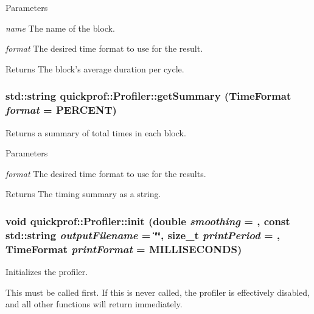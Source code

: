 \begin{DoxyParams}{Parameters}
\item[{\em name}]The name of the block. \item[{\em format}]The desired time format to use for the result. \end{DoxyParams}
\begin{DoxyReturn}{Returns}
The block's average duration per cycle. 
\end{DoxyReturn}
\hypertarget{classquickprof_1_1_profiler_aa05f7c66bdaa565267235dc76671bf1e}{
\subsubsection[{getSummary}]{\setlength{\rightskip}{0pt plus 5cm}std::string quickprof::Profiler::getSummary ({\bf TimeFormat} {\em format} = {\ttfamily PERCENT})}}
\label{classquickprof_1_1_profiler_aa05f7c66bdaa565267235dc76671bf1e}
Returns a summary of total times in each block.


\begin{DoxyParams}{Parameters}
\item[{\em format}]The desired time format to use for the results. \end{DoxyParams}
\begin{DoxyReturn}{Returns}
The timing summary as a string. 
\end{DoxyReturn}
\hypertarget{classquickprof_1_1_profiler_a53b1240186436954cabca9b492f0ab61}{
\subsubsection[{init}]{\setlength{\rightskip}{0pt plus 5cm}void quickprof::Profiler::init (double {\em smoothing} = {}, \/  const std::string {\em outputFilename} = {\ttfamily \char`\"{}\char`\"{}}, \/  size\_\-t {\em printPeriod} = {}, \/  {\bf TimeFormat} {\em printFormat} = {\ttfamily MILLISECONDS})}}
\label{classquickprof_1_1_profiler_a53b1240186436954cabca9b492f0ab61}
Initializes the profiler.

This must be called first. If this is never called, the profiler is effectively disabled, and all other functions will return immediately.


